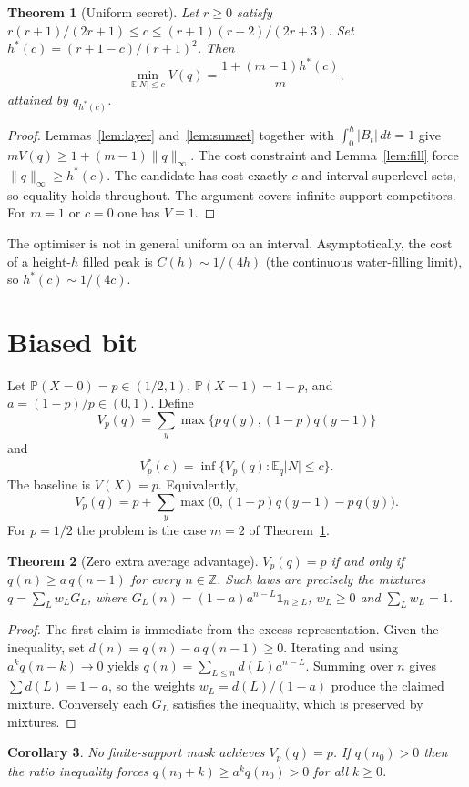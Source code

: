 \documentclass[conference]{IEEEtran}
\newtheorem{theorem}{Theorem}
\newtheorem{corollary}[theorem]{Corollary}
\newcommand{\Z}{\mathbb{Z}}
\newcommand{\E}{\mathbb{E}}
\newcommand{\Prob}{\mathbb{P}}
\begin{document}
\begin{theorem}[Uniform secret]\label{thm:uniform}
Let \(r\ge0\) satisfy \(r(r+1)/(2r+1)\le c\le(r+1)(r+2)/(2r+3)\). Set \(h^*(c)=(r+1-c)/(r+1)^2\). Then
\[
\min_{\E|N|\le c}V(q)=\frac{1+(m-1)h^*(c)}{m},
\]
attained by \(q_{h^*(c)}\).
\end{theorem}
\begin{proof}
Lemmas~\ref{lem:layer} and~\ref{lem:sumset} together with \(\int_0^h|B_t|\,dt=1\) give \(mV(q)\ge1+(m-1)\|q\|_\infty\). The cost constraint and Lemma~\ref{lem:fill} force \(\|q\|_\infty\ge h^*(c)\). The candidate has cost exactly \(c\) and interval superlevel sets, so equality holds throughout. The argument covers infinite-support competitors. For \(m=1\) or \(c=0\) one has \(V\equiv1\).
\end{proof}

The optimiser is not in general uniform on an interval. Asymptotically, the cost of a height-\(h\) filled peak is \(C(h)\sim1/(4h)\) (the continuous water-filling limit), so \(h^*(c)\sim1/(4c)\).

\section{Biased bit}
Let \(\Prob(X=0)=p\in(1/2,1)\), \(\Prob(X=1)=1-p\), and \(a=(1-p)/p\in(0,1)\). Define
\[
V_p(q)=\sum_y\max\bigl\{p\,q(y),(1-p)q(y-1)\bigr\}
\]
and
\[
V_p^*(c)=\inf\{V_p(q):\E_q|N|\le c\}.
\]
The baseline is \(V(X)=p\). Equivalently,
\[
V_p(q)=p+\sum_y\max\bigl(0,(1-p)q(y-1)-p\,q(y)\bigr).
\]
For \(p=1/2\) the problem is the case \(m=2\) of Theorem~\ref{thm:uniform}.

\begin{theorem}[Zero extra average advantage]\label{thm:zero}
\(V_p(q)=p\) if and only if \(q(n)\ge a\,q(n-1)\) for every \(n\in\Z\). Such laws are precisely the mixtures \(q=\sum_L w_L G_L\), where \(G_L(n)=(1-a)a^{n-L}\mathbf 1_{n\ge L}\), \(w_L\ge0\) and \(\sum_L w_L=1\).
\end{theorem}
\begin{proof}
The first claim is immediate from the excess representation. Given the inequality, set \(d(n)=q(n)-a\,q(n-1)\ge0\). Iterating and using \(a^k q(n-k)\to0\) yields \(q(n)=\sum_{L\le n}d(L)a^{n-L}\). Summing over \(n\) gives \(\sum d(L)=1-a\), so the weights \(w_L=d(L)/(1-a)\) produce the claimed mixture. Conversely each \(G_L\) satisfies the inequality, which is preserved by mixtures.
\end{proof}

\begin{corollary}
No finite-support mask achieves \(V_p(q)=p\). If \(q(n_0)>0\) then the ratio inequality forces \(q(n_0+k)\ge a^k q(n_0)>0\) for all \(k\ge0\).
\end{corollary}
\end{document}
